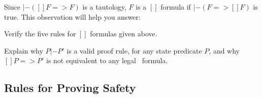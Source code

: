 \documentclass[fleqn,leqno]{article}
\begin{document}
Since $|-([]F => F)$ is a tautology, $F$ is a $[]$ formula if $|-(F
=> []F)$ is true.  This observation will help you answer:
\begin{question}
Verify the five rules for $[]$ formulas given above.
\end{question}
%

\begin{question}
Explain why $P |- P'$ is a valid proof rule, for any state predicate
$P$, and why $[]P=>P'$ is not equivalent to any legal \tlaplus\ formula.
\end{question}
%

\subsection{Rules for Proving Safety} 
\end{document}
